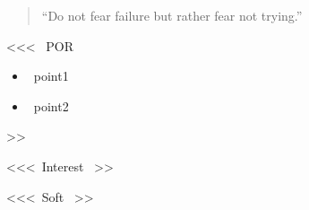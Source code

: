 \begin{quote}
``Do not fear failure but rather fear not trying.''
\end{quote}









<<< ~POR~
\begin{itemize}
\item ~point1~
\item ~point2~
\end{itemize}

\divider
>>

<<<~Interest~ >>


<<<~Soft~  >>





